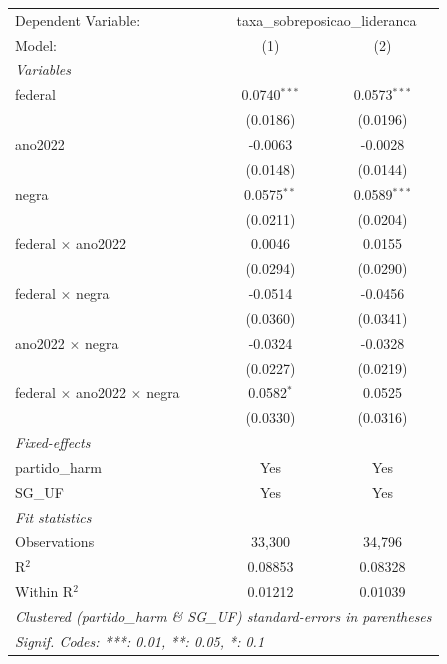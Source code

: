 
\begingroup
\centering
\begin{tabular}{lcc}
   \tabularnewline \midrule \midrule
   Dependent Variable: & \multicolumn{2}{c}{taxa\_sobreposicao\_lideranca}\\
   Model:                                    & (1)            & (2)\\  
   \midrule
   \emph{Variables}\\
   federal                                   & 0.0740$^{***}$ & 0.0573$^{***}$\\   
                                             & (0.0186)       & (0.0196)\\   
   ano2022                                   & -0.0063        & -0.0028\\   
                                             & (0.0148)       & (0.0144)\\   
   negra                                     & 0.0575$^{**}$  & 0.0589$^{***}$\\   
                                             & (0.0211)       & (0.0204)\\   
   federal $\times$ ano2022                  & 0.0046         & 0.0155\\   
                                             & (0.0294)       & (0.0290)\\   
   federal $\times$ negra                    & -0.0514        & -0.0456\\   
                                             & (0.0360)       & (0.0341)\\   
   ano2022 $\times$ negra                    & -0.0324        & -0.0328\\   
                                             & (0.0227)       & (0.0219)\\   
   federal $\times$ ano2022 $\times$ negra   & 0.0582$^{*}$   & 0.0525\\   
                                             & (0.0330)       & (0.0316)\\   
   \midrule
   \emph{Fixed-effects}\\
   partido\_harm                             & Yes            & Yes\\  
   SG\_UF                                    & Yes            & Yes\\  
   \midrule
   \emph{Fit statistics}\\
   Observations                              & 33,300         & 34,796\\  
   R$^2$                                     & 0.08853        & 0.08328\\  
   Within R$^2$                              & 0.01212        & 0.01039\\  
   \midrule \midrule
   \multicolumn{3}{l}{\emph{Clustered (partido\_harm \& SG\_UF) standard-errors in parentheses}}\\
   \multicolumn{3}{l}{\emph{Signif. Codes: ***: 0.01, **: 0.05, *: 0.1}}\\
\end{tabular}
\par\endgroup


